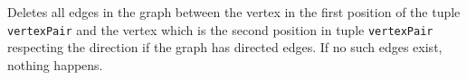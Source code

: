 \documentclass{article}
\begin{document}
\begin{description}
  Deletes all edges in the graph
  between the vertex in the first position of the tuple \texttt{vertexPair} and the vertex which is the second position in tuple \texttt{vertexPair} respecting
  the direction if the graph has directed edges.
  If no such edges exist, nothing happens.
  

  
\end{description}
\end{document}
